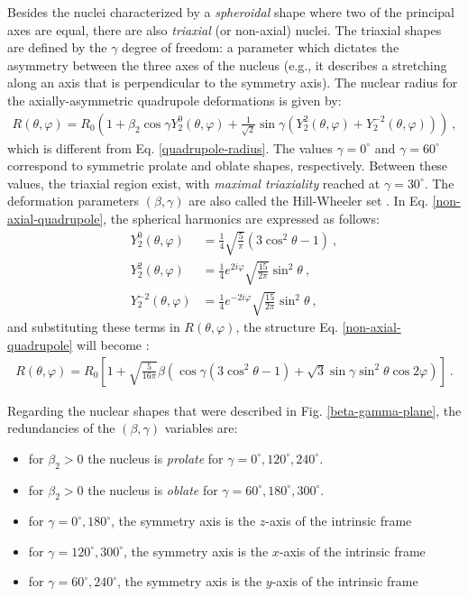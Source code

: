 Besides the nuclei characterized by a \emph{spheroidal} shape where two of the principal axes are equal, there are also \emph{triaxial} (or non-axial) nuclei. The triaxial shapes are defined by the $\gamma$ degree of freedom: a parameter which dictates the asymmetry between the three axes of the nucleus (e.g., it describes a stretching along an axis that is perpendicular to the symmetry axis). The nuclear radius for the axially-asymmetric quadrupole deformations is given by:
\begin{align}
    R(\theta,\varphi)=R_0\left(1+\beta_2\cos\gamma Y_2^0(\theta,\varphi)+\frac{1}{\sqrt{2}}\sin\gamma(Y_2^2(\theta,\varphi)+Y_2^{-2}(\theta,\varphi))\right)\ ,
    \label{non-axial-quadrupole}
\end{align}
which is different from Eq. \ref{quadrupole-radius}. The values $\gamma=0^\circ$ and $\gamma=60^\circ$ correspond to symmetric prolate and oblate shapes, respectively. Between these values, the triaxial region exist, with \emph{maximal triaxiality} reached at $\gamma=30^\circ$. The deformation parameters $(\beta,\gamma)$ are also called the Hill-Wheeler set \cite{wong2008introductory}. In Eq. \ref{non-axial-quadrupole}, the spherical harmonics are expressed as follows:
\begin{align}
    Y_2^0(\theta,\varphi)&=\frac{1}{4}\sqrt{\frac{5}{\pi}}\left(3\cos^2\theta-1\right)\ , \nonumber\\
    Y_2^2(\theta,\varphi)&=\frac{1}{4}e^{2i\varphi}\sqrt{\frac{15}{2\pi}}\sin^2\theta\ ,\nonumber\\
    Y_2^{-2}(\theta,\varphi)&=\frac{1}{4}e^{-2i\varphi}\sqrt{\frac{15}{2\pi}}\sin^2\theta\ ,
\end{align}
and substituting these terms in $R(\theta,\varphi)$, the structure Eq. \ref{non-axial-quadrupole} will become \cite{andersson1976nuclear,bohr1998nuclear}:
\begin{align}
    R(\theta,\varphi)=R_0\left[1+\sqrt{\frac{5}{16\pi}}\beta\left(\cos\gamma(3\cos^2\theta-1)+\sqrt{3}\sin\gamma\sin^2\theta\cos2\varphi\right)\right]\ .
\end{align}

Regarding the nuclear shapes that were described in Fig. \ref{beta-gamma-plane}, the redundancies of the $(\beta,\gamma)$ variables are:
\begin{itemize}
    \item for $\beta_2>0$ the nucleus is \emph{prolate} for $\gamma=0^\circ,120^\circ,240^\circ$.
    \item for $\beta_2>0$ the nucleus is \emph{oblate} for $\gamma=60^\circ,180^\circ,300^\circ$.
    \item for $\gamma=0^\circ,180^\circ$, the symmetry axis is the $z$-axis of the intrinsic frame
    \item for $\gamma=120^\circ,300^\circ$, the symmetry axis is the $x$-axis of the intrinsic frame
    \item for $\gamma=60^\circ,240^\circ$, the symmetry axis is the $y$-axis of the intrinsic frame
\end{itemize}

